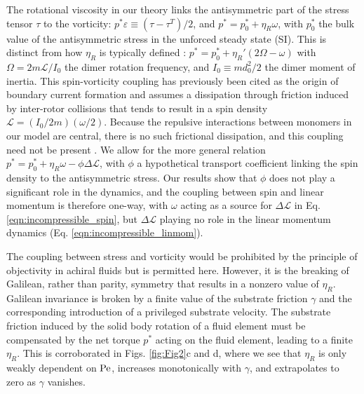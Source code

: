 \documentclass[%
 reprint,
superscriptaddress,
longbibliography,
 amsmath,amssymb,
 prl,
 citeautoscript,
]{revtex4-1}
\begin{document}
The rotational viscosity in our theory links the antisymmetric part of the stress tensor $\tau$ to the vorticity: $p^* \varepsilon \equiv \left( \tau - \tau^T \right)/2$, and $p^* = p^*_0 + \eta_R \omega$, with $p^*_0$ the bulk value of the antisymmetric stress in the unforced steady state (SI). This is distinct from how $\eta_R$ is typically defined \cite{etaR1, etaR1, etaR3, etaR4, etaR5, lubensky_etaR6}: $p^* = p^*_0 + \eta_R' \left( 2 \Omega - \omega \right)$ with $\Omega = 2m \mathcal{L} / I_0$ the dimer rotation frequency, and $I_0 \equiv md_0^2/2$ the dimer moment of inertia. This spin-vorticity coupling has previously been cited as the origin of boundary current formation \cite{lubensky_etaR6, waves_Kranthi, free_surface, crystal} and assumes a dissipation through friction induced by inter-rotor collisions that tends to result in a spin density $\mathcal{L} = (I_0/2m) (\omega/2)$. Because the repulsive interactions between monomers in our model are central, there is no such frictional dissipation, and this coupling need not be present \cite{etaR1,Kranthi1}.
We allow for the more general relation $p^* = p^*_0 + \eta_R \omega - \phi \Delta \mathcal{L}$, with $\phi$ a hypothetical transport coefficient linking the spin density to the antisymmetric stress. Our results show that $\phi$ does not play a significant role in the dynamics, and the coupling between spin and linear momentum is therefore one-way, with $\omega$ acting as a source for $\Delta \mathcal{L}$ in Eq. \ref{eqn:incompressible_spin}, but $\Delta \mathcal{L}$ playing no role in the linear momentum dynamics (Eq. \ref{eqn:incompressible_linmom}).

The coupling between stress and vorticity would be prohibited by the principle of objectivity in achiral fluids \cite{Kranthi1} but is permitted here. However, it is the breaking of Galilean, rather than parity, symmetry that results in a nonzero value of $\eta_R$. Galilean invariance is broken by a finite value of the substrate friction $\gamma$ and the corresponding introduction of a privileged substrate velocity. The substrate friction induced by the solid body rotation of a fluid element must be compensated by the net torque $p^*$ acting on the fluid element, leading to a finite $\eta_R$. This is corroborated in Figs. \ref{fig:Fig2}c and d, where we see that $\eta_R$ is only weakly dependent on $\rm Pe$, increases monotonically with $\gamma$, and extrapolates to zero as $\gamma$ vanishes.
\end{document}
